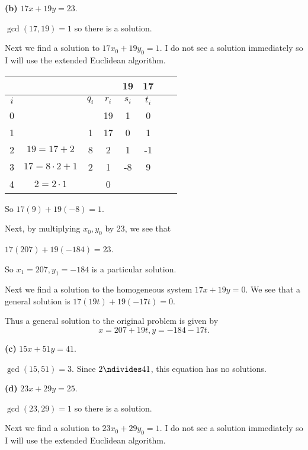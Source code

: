 \documentclass[oneside,12pt]{amsart}
\begin{document}
\bigskip

\textbf{(b)} $17x +19y = 23$.

$\gcd(17,19) = 1$ so there is a solution.

Next we find a solution to $17x_0 + 19y_0 =1$. I do not see a solution immediately
so I will use the extended Euclidean algorithm.

\begin{tabular}{|c|c|c|c|c|c|c|c|}
\hline
\quad & \quad               & \quad   & \quad & 19     & 17   \\ \hline
$i$   & \quad               & $q_{i}$ & $r_i$ & $s_i$  & $t_i$ \\ \hline\hline
0     & \quad               & \quad   & 19    &  1     & 0     \\ \hline
1     & \quad               &  1      & 17    &  0     & 1     \\ \hline
2     & $19 = 17 + 2$       &  8      &  2    &  1     &-1     \\ \hline
3     & $17 = 8\cdot 2 + 1$ &  2      &  1    & -8     & 9     \\ \hline
4     & $2 =  2\cdot 1 $    &         &  0    &        &     \\ \hline
\end{tabular}

So $17(9) + 19(-8) = 1$.

Next, by multiplying $x_0,y_0$ by 23, we see that

$17(207) + 19(-184) = 23$.

So $x_1=207, y_1=-184$ is a particular solution.

Next we find a solution to the homogeneous system $17x+19y = 0$.
We see that a general solution is $17(19t)+19(-17t) = 0$.

Thus a general solution to the original problem is given by
$$x=207+19t, y=-184-17t.$$

\bigskip

\textbf{(c)} $15x + 51y = 41$.

$\gcd(15, 51) = 3$. Since $2\ndivides 41$, this equation has no solutions.

\bigskip

\textbf{(d)} $23x + 29y = 25$.

$\gcd(23, 29) = 1$ so there is a solution.

Next we find a solution to $23x_0 + 29y_0 = 1$. I do not see a solution immediately
so I will use the extended Euclidean algorithm.
\end{document}
